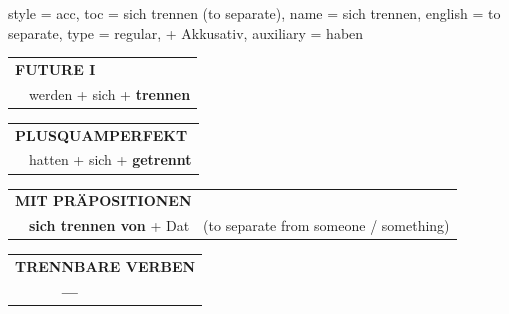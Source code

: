 \begin{verbentry}{
  style = {acc},
  toc = {sich trennen (to separate)},
  name = {sich trennen},
  english = {to separate},
  type = {regular, + Akkusativ},
  auxiliary = {haben}
}
\begin{tabular}{rl}
    \multicolumn{2}{l}{\textbf{FUTURE I} }\\
    &werden + sich + \textbf{trennen}\\
 
  \end{tabular}
\hfill
   \begin{tabular}{rl}
      \multicolumn{2}{l}{\textbf{PLUSQUAMPERFEKT}}\\
    &hatten + sich + \textbf{getrennt}\\
  \end{tabular}
  
\vspace{10pt}

   \begin{tabular}{lll}
      \multicolumn{3}{l}{\textbf{MIT PRÄPOSITIONEN}}\\
& \textbf{sich trennen von} + Dat & (to separate from someone / something)
  \end{tabular}
\hfill
\begin{tabular}{lll}
\multicolumn{3}{l}{\textbf{TRENNBARE VERBEN}}\\
& \textbf{---} & \\
\end{tabular}
  
  \vspace{-5pt}
\end{verbentry}

